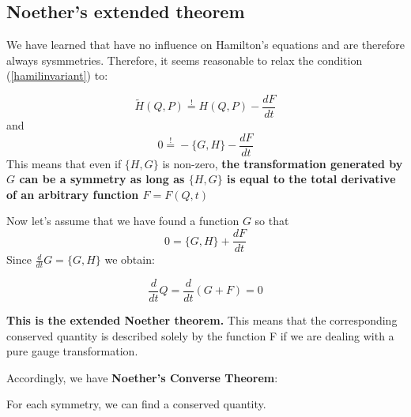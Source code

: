 \subsection{Noether's extended theorem}
We have learned that  have no influence on Hamilton's equations and are therefore always sysmmetries. Therefore, it seems reasonable to relax the condition (\ref{hamilinvariant}) to:
\begin{qt}
    \begin{equation}
\tilde{H}(Q, P) \stackrel{!}{=} H(Q, P)-\frac{d F}{d t}
\end{equation}
and
\begin{equation}
0 \stackrel{!}{=}-\{G, H\}-\frac{d F}{d t}
\end{equation}
This means that even if $\{H, G\}$ is non-zero, \textbf{the transformation generated by $G$ can be a symmetry as long as $\{H, G\}$ is equal to the total derivative of an arbitrary function $F=F(Q, t)$}
\end{qt}
Now let’s assume that we have found a function $G$ so that
\begin{equation}
0=\{G, H\}+\frac{d F}{d t}
\end{equation}
Since $\frac{d}{d t} G=\{G, H\}$ we obtain:
\begin{qt}
    \begin{equation}
\frac{d}{d t} Q=\frac{d}{d t}(G+F) = 0
\end{equation}
\end{qt}
\textbf{This is the extended Noether theorem.} This means that the corresponding conserved quantity is described solely by the function F if we are dealing with a pure gauge transformation.
\begin{qt}
Accordingly, we have \textbf{Noether's Converse Theorem}:
\begin{center}
    
    For each symmetry, we can find a conserved quantity.
\end{center}
    
\end{qt}

